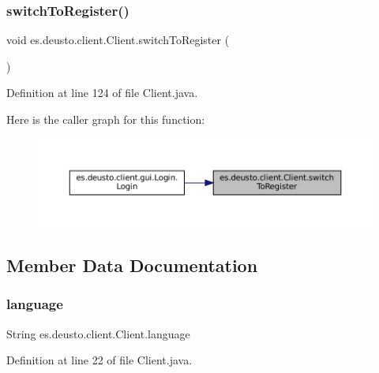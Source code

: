\subsubsection{\texorpdfstring{switchToRegister()}{switchToRegister()}}
{\footnotesize\ttfamily void es.\+deusto.\+client.\+Client.\+switch\+To\+Register (\begin{DoxyParamCaption}{ }\end{DoxyParamCaption})}



Definition at line 124 of file Client.\+java.

Here is the caller graph for this function\+:
\nopagebreak
\begin{figure}[H]
\begin{center}
\leavevmode
\includegraphics[width=350pt]{classes_1_1deusto_1_1client_1_1_client_a8b292db7d6ec16eaa53b224bb7a33ab4_icgraph}
\end{center}
\end{figure}


\subsection{Member Data Documentation}
\mbox{\label{classes_1_1deusto_1_1client_1_1_client_a946c8733595a67fff10908135b56564b}} 
\subsubsection{\texorpdfstring{language}{language}}
{\footnotesize\ttfamily String es.\+deusto.\+client.\+Client.\+language}



Definition at line 22 of file Client.\+java.

\mbox{\label{classes_1_1deusto_1_1client_1_1_client_ac0529c523794059756ce5185ac0a0d48}} 
